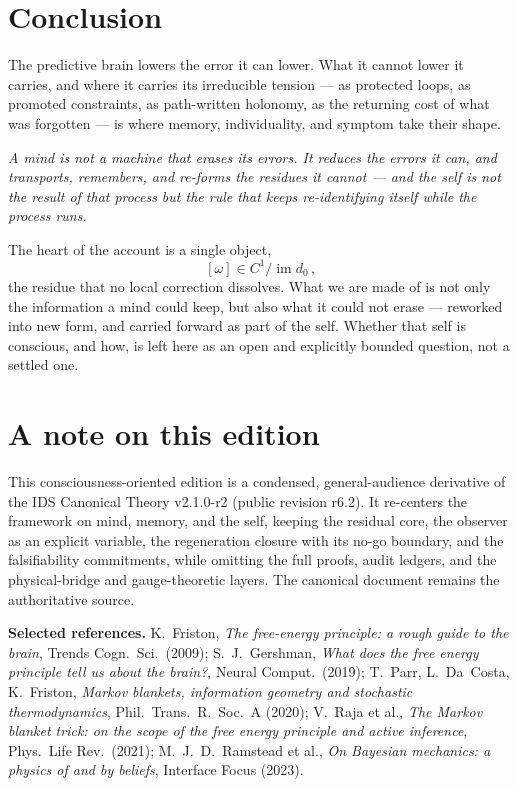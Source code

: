 \documentclass[11pt,a4paper]{article}
\newenvironment{canonbox}{\begin{mdframed}[style=canon]\itshape}{\end{mdframed}}
\theoremstyle{plain}
\begin{document}
\section{Conclusion}\label{sec:conclusion}

The predictive brain lowers the error it can lower. What it cannot lower it carries, and where it carries
its irreducible tension --- as protected loops, as promoted constraints, as path-written holonomy, as the
returning cost of what was forgotten --- is where memory, individuality, and symptom take their shape.

\begin{canonbox}
A mind is not a machine that erases its errors. It reduces the errors it can, and transports, remembers,
and re-forms the residues it cannot --- and the self is not the result of that process but the rule that
keeps re-identifying itself while the process runs.
\end{canonbox}

The heart of the account is a single object,
\[
\boxed{\,[\omega]\in C^1/\operatorname{im}d_0\,,}
\]
the residue that no local correction dissolves. What we are made of is not only the information a mind
could keep, but also what it could not erase --- reworked into new form, and carried forward as part of
the self. Whether that self is conscious, and how, is left here as an open and explicitly bounded
question, not a settled one.

\section*{A note on this edition}

This consciousness-oriented edition is a condensed, general-audience derivative of the IDS Canonical
Theory v2.1.0-r2 (public revision r6.2). It re-centers the framework on mind, memory, and the self,
keeping the residual core, the observer as an explicit variable, the regeneration closure with its no-go
boundary, and the falsifiability commitments, while omitting the full proofs, audit ledgers, and the
physical-bridge and gauge-theoretic layers. The canonical document remains the authoritative source.

\bigskip
\noindent\footnotesize\textbf{Selected references.}
K.~Friston, \emph{The free-energy principle: a rough guide to the brain}, Trends Cogn.\ Sci.\ (2009);
S.~J.~Gershman, \emph{What does the free energy principle tell us about the brain?}, Neural Comput.\ (2019);
T.~Parr, L.~Da~Costa, K.~Friston, \emph{Markov blankets, information geometry and stochastic thermodynamics},
Phil.\ Trans.\ R.\ Soc.\ A (2020);
V.~Raja et al., \emph{The Markov blanket trick: on the scope of the free energy principle and active inference},
Phys.\ Life Rev.\ (2021);
M.~J.~D.~Ramstead et al., \emph{On Bayesian mechanics: a physics of and by beliefs}, Interface Focus (2023).
\end{document}
